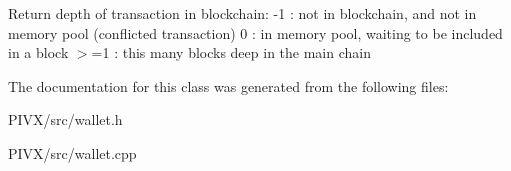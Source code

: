 Return depth of transaction in blockchain\+: -\/1 \+: not in blockchain, and not in memory pool (conflicted transaction) 0 \+: in memory pool, waiting to be included in a block $>$=1 \+: this many blocks deep in the main chain 

The documentation for this class was generated from the following files\+:\begin{DoxyCompactItemize}
\item 
P\+I\+V\+X/src/wallet.\+h\item 
P\+I\+V\+X/src/wallet.\+cpp\end{DoxyCompactItemize}
